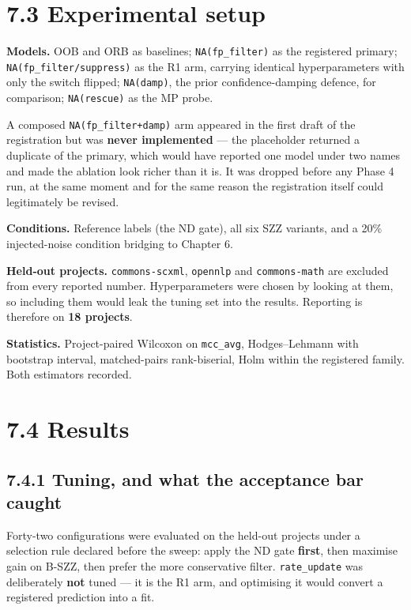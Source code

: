\section{7.3 Experimental setup}\label{experimental-setup}

\textbf{Models.} OOB and ORB as baselines; \texttt{NA(fp\_filter)} as
the registered primary; \texttt{NA(fp\_filter/suppress)} as the R1 arm,
carrying identical hyperparameters with only the switch flipped;
\texttt{NA(damp)}, the prior confidence-damping defence, for comparison;
\texttt{NA(rescue)} as the MP probe.

A composed \texttt{NA(fp\_filter+damp)} arm appeared in the first draft
of the registration but was \textbf{never implemented} --- the
placeholder returned a duplicate of the primary, which would have
reported one model under two names and made the ablation look richer
than it is. It was dropped before any Phase 4 run, at the same moment
and for the same reason the registration itself could legitimately be
revised.

\textbf{Conditions.} Reference labels (the ND gate), all six SZZ
variants, and a 20\% injected-noise condition bridging to Chapter 6.

\textbf{Held-out projects.} \texttt{commons-scxml}, \texttt{opennlp} and
\texttt{commons-math} are excluded from every reported number.
Hyperparameters were chosen by looking at them, so including them would
leak the tuning set into the results. Reporting is therefore on
\textbf{18 projects}.

\textbf{Statistics.} Project-paired Wilcoxon on \texttt{mcc\_avg},
Hodges--Lehmann with bootstrap interval, matched-pairs rank-biserial,
Holm within the registered family. Both estimators recorded.

\section{7.4 Results}\label{results}

\subsection{7.4.1 Tuning, and what the acceptance bar
caught}\label{tuning-and-what-the-acceptance-bar-caught}

Forty-two configurations were evaluated on the held-out projects under a
selection rule declared before the sweep: apply the ND gate
\textbf{first}, then maximise gain on B-SZZ, then prefer the more
conservative filter. \texttt{rate\_update} was deliberately \textbf{not}
tuned --- it is the R1 arm, and optimising it would convert a registered
prediction into a fit.

